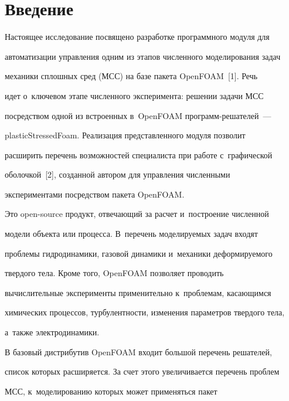   


\section{Введение}





   Настоящее исследование посвящено разработке программного модуля для 


автоматизации управ\-ле\-ния одним из этапов чис\-лен\-но\-го моделирования задач 


механики сплош\-ных сред (МСС) на базе пакета \mbox{OpenFOAM}~[1]. Речь 


идет о~ключевом этапе чис\-лен\-но\-го эксперимента: решении задачи МСС 


посредством одной из встроенных в~\mbox{OpenFOAM} про\-грамм-ре\-ша\-те\-лей~--- 


\mbox{plasticStressedFoam}. Реализация пред\-став\-лен\-но\-го модуля поз\-во\-лит 


расширить перечень возможностей специалиста при работе с~графической 


оболочкой~[2], созданной автором для управ\-ле\-ния чис\-лен\-ны\-ми 


экспериментами по\-сред\-ст\-вом пакета \mbox{OpenFOAM}.


   


   Это open-source продукт, отвечающий за расчет и~по\-стро\-ение чис\-лен\-ной 


модели объекта или процесса. В~перечень моделируемых задач входят 


проб\-ле\-мы гид\-ро\-ди\-на\-ми\-ки, газовой динамики и~механики деформируемого 


твердого тела. Кроме того, \mbox{OpenFOAM} позволяет проводить 


вычислительные эксперименты применительно к~проб\-ле\-мам, ка\-са\-ющим\-ся 


химических процессов, тур\-бу\-лент\-ности, изменения па\-ра\-мет\-ров твер\-до\-го тела, 


а~также электродинамики.


   


   В базовый дистрибутив OpenFOAM входит большой перечень решателей, 


список которых расширяется. За счет этого увеличивается перечень проб\-лем 


МСС, к~моделированию которых может применяться пакет 


